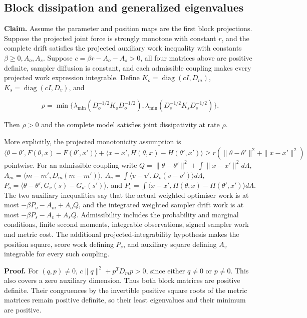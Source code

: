 \documentclass[11pt,a4paper]{report}
\begin{document}
\subsection{\texorpdfstring{Block dissipation and generalized eigenvalues}{Block dissipation and generalized eigenvalues}}


\textbf{Claim.} Assume the parameter and position maps are the first block projections. Suppose the projected joint force is strongly monotone with constant \(r\), and the complete drift satisfies the projected auxiliary work inequality with constants \(\beta\ge0,A_o,A_s\). Suppose \(c=\beta r-A_o-A_s>0\), all four matrices above are positive definite, sampler diffusion is constant, and each admissible coupling makes every projected work expression integrable. Define \(K_o=\operatorname{diag}(cI,D_m)\), \(K_s=\operatorname{diag}(cI,D_v)\), and

\[\rho=\min\{\lambda_{\min}(D_o^{-1/2}K_oD_o^{-1/2}),\lambda_{\min}(D_s^{-1/2}K_sD_s^{-1/2})\}.\]

Then \(\rho>0\) and the complete model satisfies joint dissipativity at rate \(\rho\).



More explicitly, the projected monotonicity assumption is \(\langle\theta-\theta',F(\theta,x)-F(\theta',x')\rangle+\langle x-x',H(\theta,x)-H(\theta',x')\rangle\ge r(\|\theta-\theta'\|^2+\|x-x'\|^2)\) pointwise. For an admissible coupling write \(Q=\|\theta-\theta'\|^2+\int\|x-x'\|^2d\Lambda\), \(A_m=\langle m-m',D_m(m-m')\rangle\), \(A_v=\int\langle v-v',D_v(v-v')\rangle d\Lambda\), \(P_o=\langle\theta-\theta',G_\nu(s)-G_{\nu'}(s')\rangle\), and \(P_s=\int\langle x-x',H(\theta,x)-H(\theta',x')\rangle d\Lambda\). The two auxiliary inequalities say that the actual weighted optimiser work is at most \(-\beta P_o-A_m+A_oQ\), and the integrated weighted sampler drift work is at most \(-\beta P_s-A_v+A_sQ\). Admissibility includes the probability and marginal conditions, finite second moments, integrable observations, signed sampler work and metric cost. The additional projected-integrability hypothesis makes the position square, score work defining \(P_s\), and auxiliary square defining \(A_v\) integrable for every such coupling.



\textbf{Proof.} For \((q,p)\ne0\), \(c\|q\|^2+p^TD_mp>0\), since either \(q\ne0\) or \(p\ne0\). This also covers a zero auxiliary dimension. Thus both block matrices are positive definite. Their congruences by the invertible positive square roots of the metric matrices remain positive definite, so their least eigenvalues and their minimum are positive.
\end{document}
